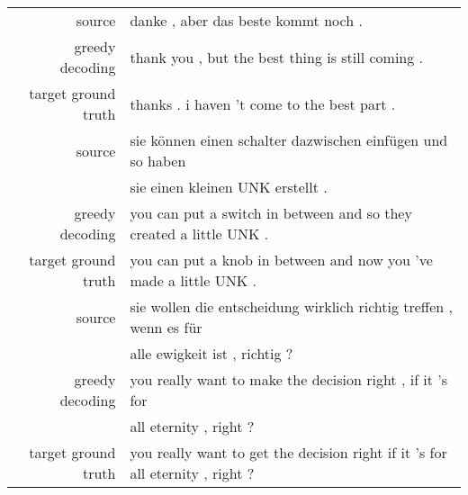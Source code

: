 \documentclass{article}
\begin{document}
\begin{table*}[h!] \begin{small}
		{
			\begin{center}
				\begin{tabular}{rl}
					\hline


					


					source &  danke , aber das beste kommt noch .				
					\\
					greedy decoding& thank you  ,  but  the best thing  is still coming  .   \\
					target ground truth & thanks . i haven 't come to the best part .				
					\\			
\hline
					source &  sie k\"onnen einen schalter dazwischen einf\"ugen und so haben \\& sie einen kleinen UNK erstellt .\\
					greedy decoding&  you can put  a switch  in between  and  so  they created  a little  UNK . \\
					target ground truth & you can put a knob in between and now you 've made a little UNK .
					\\			
					\hline
source &  sie wollen die entscheidung wirklich richtig treffen , wenn es f\"ur \\& alle ewigkeit ist , richtig ?
					\\
					greedy decoding&  you really want to make  the decision  right  ,  if  it 's  for  \\& all  eternity  ,  right  ?   \\
					target ground truth & you really want to get the decision right if it 's for all eternity , right ?
					\\			
					\hline





\end{tabular}
\end{center}}
\end{small}
\end{table*}
\end{document}
